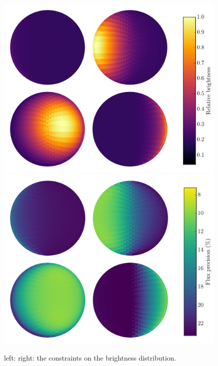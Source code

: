 \documentclass[a4paper,fleqn,usenatbib]{mnras}
\begin{document}
\begin{figure}
\begin{center}
\includegraphics[width=\columnwidth]{img/free_parametersflux_map.pdf}
\includegraphics[width=\columnwidth]{img/free_parametersflux_errs.pdf}
\caption{left: right: the constraints on the brightness distribution.}
\label{fig:best_fit_flux}
\end{center}
\end{figure}
\end{document}
